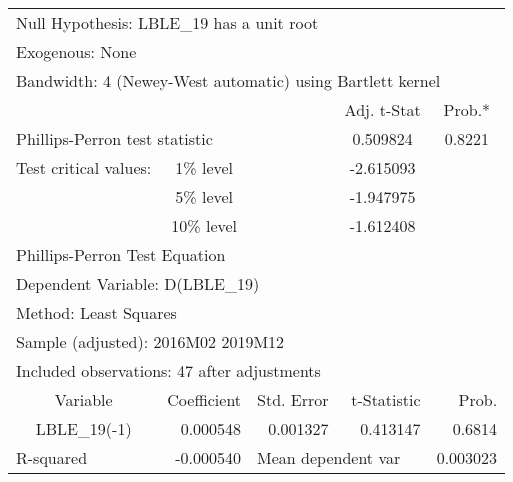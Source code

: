 \begin{tabular}{lrrrr}
\toprule
\multicolumn{3}{l}{Null Hypothesis: LBLE\_19 has a unit root}&\multicolumn{1}{c}{}&\multicolumn{1}{c}{}\\
\multicolumn{1}{l}{Exogenous: None}&\multicolumn{1}{c}{}&\multicolumn{1}{c}{}&\multicolumn{1}{c}{}&\multicolumn{1}{c}{}\\
\multicolumn{5}{l}{Bandwidth: 4 (Newey-West automatic) using Bartlett kernel}\\
\midrule
\multicolumn{1}{c}{}&\multicolumn{1}{c}{}&\multicolumn{1}{c}{}&\multicolumn{1}{c}{Adj. t-Stat}&\multicolumn{1}{c}{Prob.*}\\
\midrule
\multicolumn{2}{l}{Phillips-Perron test statistic}&\multicolumn{1}{l}{}&\multicolumn{1}{c}{0.509824}&\multicolumn{1}{c}{0.8221}\\
\multicolumn{1}{l}{Test critical values:}&\multicolumn{1}{c}{1\% level}&\multicolumn{1}{c}{}&\multicolumn{1}{c}{-2.615093}&\multicolumn{1}{c}{}\\
\multicolumn{1}{c}{}&\multicolumn{1}{c}{5\% level}&\multicolumn{1}{c}{}&\multicolumn{1}{c}{-1.947975}&\multicolumn{1}{c}{}\\
\multicolumn{1}{c}{}&\multicolumn{1}{c}{10\% level}&\multicolumn{1}{c}{}&\multicolumn{1}{c}{-1.612408}&\multicolumn{1}{c}{}\\
\midrule
\multicolumn{2}{l}{Phillips-Perron Test Equation}&\multicolumn{1}{c}{}&\multicolumn{1}{c}{}&\multicolumn{1}{c}{}\\
\multicolumn{3}{l}{Dependent Variable: D(LBLE\_19)}&\multicolumn{1}{c}{}&\multicolumn{1}{c}{}\\
\multicolumn{2}{l}{Method: Least Squares}&\multicolumn{1}{c}{}&\multicolumn{1}{c}{}&\multicolumn{1}{c}{}\\
\multicolumn{3}{l}{Sample (adjusted): 2016M02 2019M12}&\multicolumn{1}{c}{}&\multicolumn{1}{c}{}\\
\multicolumn{4}{l}{Included observations: 47 after adjustments}&\multicolumn{1}{c}{}\\
\midrule
\multicolumn{1}{c}{Variable}&\multicolumn{1}{r}{Coefficient}&\multicolumn{1}{r}{Std. Error}&\multicolumn{1}{r}{t-Statistic}&\multicolumn{1}{r}{Prob.}\\
\midrule
\multicolumn{1}{c}{LBLE\_19(-1)}&\multicolumn{1}{r}{0.000548}&\multicolumn{1}{r}{0.001327}&\multicolumn{1}{r}{0.413147}&\multicolumn{1}{r}{0.6814}\\
\midrule
\multicolumn{1}{l}{R-squared}&\multicolumn{1}{r}{-0.000540}&\multicolumn{2}{l}{Mean dependent var}&\multicolumn{1}{r}{0.003023}\\

\end{tabular}
